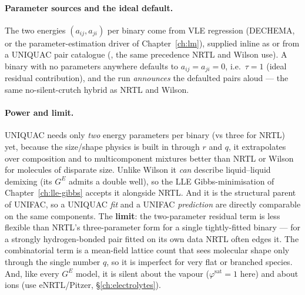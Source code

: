 \documentclass[11pt,a4paper]{article}
\newcommand{\Gex}{G^{E}}
\begin{document}
\paragraph{Parameter sources and the ideal default.} The two energies
$(a_{ij}, a_{ji})$ per binary come from VLE regression (DECHEMA, or the
parameter-estimation driver of Chapter~\ref{ch:lm}), supplied inline as
 or from a UNIQUAC pair catalogue
(, the same precedence
NRTL and Wilson use). A binary with no parameters anywhere defaults to
$a_{ij}=a_{ji}=0$, i.e.\ $\tau=1$ (ideal residual contribution), and the
run \emph{announces} the defaulted pairs aloud --- the same
no-silent-crutch hybrid as NRTL and Wilson.

\paragraph{Power and limit.}
UNIQUAC needs only \emph{two} energy parameters per binary (vs three for
NRTL) yet, because the size/shape physics is built in through $r$ and
$q$, it extrapolates over composition and to multicomponent mixtures
better than NRTL or Wilson for molecules of disparate size. Unlike Wilson
it \emph{can} describe liquid--liquid demixing (its $\Gex$ admits a
double well), so the LLE Gibbs-minimisation of
Chapter~\ref{ch:lle-gibbs} accepts it alongside NRTL. And it is the
structural parent of UNIFAC, so a UNIQUAC \emph{fit} and a UNIFAC
\emph{prediction} are directly comparable on the same components. The
\textbf{limit}: the two-parameter residual term is less flexible than
NRTL's three-parameter form for a single tightly-fitted binary --- for a
strongly hydrogen-bonded pair fitted on its own data NRTL often edges it.
The combinatorial term is a mean-field lattice count that sees molecular
shape only through the single number $q$, so it is imperfect for very
flat or branched species. And, like every $\Gex$ model, it is silent
about the vapour ($\varphi^{\mathrm{sat}}=1$ here) and about ions (use
eNRTL/Pitzer, \S\ref{ch:electrolytes}).
\end{document}
